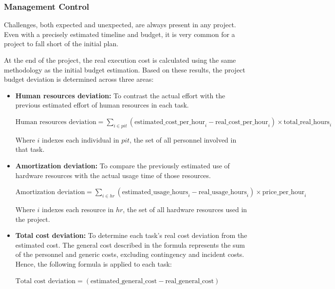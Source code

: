 \subsubsection{Management Control}

Challenges, both expected and unexpected, are always present in any project. Even with a precisely estimated timeline and budget, it is very common for a project to fall short of the initial plan. 

At the end of the project, the real execution cost is calculated using the same methodology as the initial budget estimation. Based on these results, the project budget deviation is determined across three areas:
 

\begin{itemize} [leftmargin=0.75cm, noitemsep]
    \item \textbf{Human resources deviation:} To contrast the actual effort with the previous estimated effort of human resources in each task.
    
    \vspace{5pt}
    {\footnotesize
    \centerline{$\displaystyle
    \text{Human resources deviation} =
    \sum_{i \in pit} 
    \left(
    \text{estimated\_cost\_per\_hour}_i - \text{real\_cost\_per\_hour}_i
    \right) 
    \times
    \text{total\_real\_hours}_i
    $}
    }

    {\footnotesize
        Where $i$ indexes each individual in $pit$, the set of all personnel involved in that task.
    }
    
    \item \textbf{Amortization deviation:} To compare the previously estimated use of hardware resources with the actual usage time of those resources.
    
    \vspace{5pt}
    {\footnotesize
    \centerline{$\displaystyle
    \text{Amortization deviation} =
    \sum_{i \in hr} 
    \left(
    \text{estimated\_usage\_hours}_i - \text{real\_usage\_hours}_i
    \right) 
    \times
    \text{price\_per\_hour}_i
    $}
    }
    
    {\footnotesize
        Where $i$ indexes each resource in $hr$, the set of all hardware resources used in the project.
    }

    \item \textbf{Total cost deviation:} To determine each task's real cost deviation from the estimated cost. The general cost described in the formula represents the sum of the personnel and generic costs, excluding contingency and incident costs. Hence, the following formula is applied to each task:

    \vspace{5pt}
    {\small
    \centerline{$\displaystyle
    \text{Total cost deviation} =
    \left(
    \text{estimated\_general\_cost} - \text{real\_general\_cost}
    \right) 
    $}
    }
    
\end{itemize}

